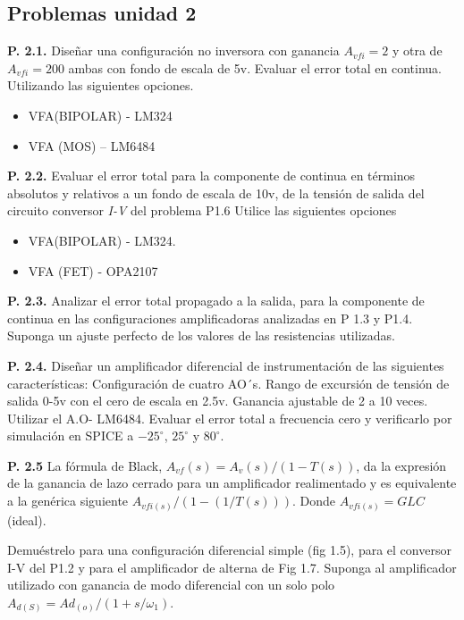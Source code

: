 \subsection{Problemas unidad 2}
\noindent \textbf{P. 2.1.} Diseñar una configuración no inversora con ganancia $A_{vfi} = 2$ y otra de $A_{vfi} = 200$ ambas con fondo de escala de 5v. Evaluar el error total en continua. Utilizando las siguientes opciones.

\begin{itemize}
    \item[a)] VFA(BIPOLAR) - LM324
    \item[b)] VFA (MOS) – LM6484
\end{itemize}

\noindent \textbf{P. 2.2.} Evaluar el error total para la componente de continua en términos absolutos y relativos a un fondo de escala de 10v, de la tensión de salida del circuito conversor \textit{I-V} del problema P1.6 Utilice las siguientes opciones

\begin{itemize}
    \item[a)] VFA(BIPOLAR) - LM324.
    \item[b)] VFA (FET) - OPA2107
\end{itemize}

\noindent \textbf{P. 2.3.} Analizar el error total propagado a la salida, para la componente de continua en las configuraciones amplificadoras analizadas en P 1.3 y P1.4. Suponga un ajuste perfecto de los valores de las resistencias utilizadas.

\noindent \textbf{P. 2.4.} Diseñar un amplificador diferencial de instrumentación de las siguientes características: Configuración de cuatro AO´s. Rango de excursión de tensión de salida 0-5v con el cero de escala en 2.5v. Ganancia ajustable de 2 a 10 veces. Utilizar el A.O- LM6484. Evaluar el error total a frecuencia cero y verificarlo por simulación en SPICE a $-25^\circ$, $25^\circ$ y $80^\circ$.

\noindent \textbf{P. 2.5} La fórmula de Black, $A_{vf}(s) = A_v(s)/(1-T(s))$, da la expresión de la ganancia de lazo cerrado para un amplificador realimentado y es equivalente a la genérica siguiente $A_{vfi(s)} / (1-(1/T(s)))$. Donde $A_{vfi(s)} = GLC$ (ideal).

\noindent Demuéstrelo para una configuración diferencial simple (fig 1.5), para el conversor I-V del P1.2 y para el amplificador de alterna de Fig 1.7. Suponga al amplificador utilizado con ganancia de modo diferencial con un solo polo $A_{d(S)} = Ad_{(o)} / (1+ s / \omega_1 )$.

